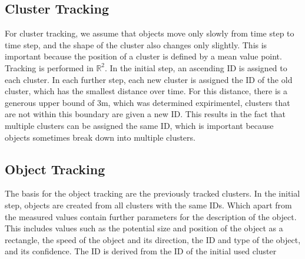 \documentclass[11pt,oneside,openright]{mpreport}
\begin{document}
\subsection{Cluster Tracking}
For cluster tracking, we assume that objects move only slowly from time step to time step, and the shape of the cluster also changes only slightly. 
This is important because the position of a cluster is defined by a mean value point. Tracking is performed in $\mathbb{R}^2$. 
In the initial step, an ascending ID is assigned to each cluster.
In each further step, each new cluster is assigned the ID of the old cluster, which has the smallest distance over time.
For this distance, there is a generous upper bound of 3m, which was determined expirimentel, clusters that are not within this boundary are given a new ID.
This results in the fact that multiple clusters can be assigned the same ID, which is important because objects sometimes break down into multiple clusters.

\subsection{Object Tracking}
The basis for the object tracking are the previously tracked clusters. In the initial step, objects are created from all clusters with the same IDs.
Which apart from the measured values contain further parameters for the description of the object. This includes values such as the potential size and 
position of the object as a rectangle, the speed of the object and its direction, the ID and type of the object, and its confidence. The ID is derived from the ID of the initial used cluster
\end{document}
